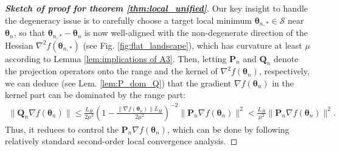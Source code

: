 \documentclass[11pt]{amsart}
\theoremstyle{plain}
\theoremstyle{definition}
\theoremstyle{remark}
\def\bQ{\mathbf{Q}}
\def\bP{\mathbf{P}}
\def\param{\boldsymbol{\theta}}
\begin{document}
\begin{proof}[\textbf{Sketch of proof for theorem \ref{thm:local_unified}}]
Our key insight to handle the degeneracy issue is to carefully choose a target local minimum $\param_{n,*}\in \mathcal{S}$ near $\param_{n}$, so that $\param_{n,*}-\param_{n}$ is now well-aligned with the non-degenerate direction of the Hessian $\nabla^{2} f(\param_{n,*})$ (see Fig. \ref{fig:flat_landscape}), which has curvature at least $\mu$ according to Lemma \ref{lem:implications of A3}. Then, letting $\bP_{n}$ and $\bQ_{n}$ denote the projection operators onto the range and the kernel of $\nabla^{2} f(\param_{n})$, respectively, we can deduce (see Lem. \ref{lem:P_dom_Q}) that the gradient $\nabla f(\param_{n})$ in the kernel part can be dominated by the range part: 
\begin{align*}
 \|\bQ_{n} \nabla f(\param_n)\|\leq \frac{L_H}{2\mu^2}\left(1-\frac{\|\nabla f(\param_n)\|L_H}{2\mu^2}\right)^{-2}\|\bP_{n}\nabla f(\param_n)\|^2<\frac{L_H}{\mu^2}\|\bP_{n}\nabla f(\param_n)\|^2.
\end{align*}
Thus, it reduces to control the $\bP_{n} \nabla f(\param_n)$, which can be done by following relatively standard second-order local convergence analysis.
\end{proof}
\fi
\end{document}
